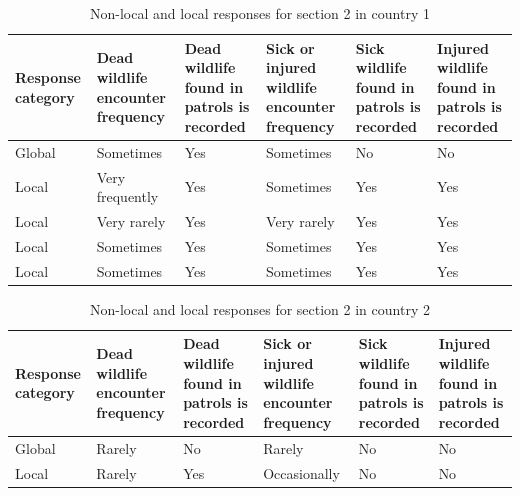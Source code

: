 \documentclass[
  letterpaper,
  DIV=11,
  numbers=noendperiod]{scrartcl}
\begin{document}
\begin{table}[H]

\caption{Non-local and local responses for section 2 in country 1}
\centering
\begin{tabular}[t]{>{\raggedright\arraybackslash}p{2cm}|>{\raggedright\arraybackslash}p{3cm}|>{\raggedright\arraybackslash}p{2cm}|>{\raggedright\arraybackslash}p{3cm}|>{\raggedright\arraybackslash}p{2cm}|>{\raggedright\arraybackslash}p{2cm}}
\hline
Response
category & Dead wildlife
encounter frequency & Dead wildlife
found in patrols
is recorded & Sick or injured wildlife
encounter frequency & Sick wildlife
found in patrols
is recorded & Injured wildlife
found in patrols
is recorded\\
\hline
Global & Sometimes & Yes & Sometimes & No & No\\
\hline
Local & Very frequently & Yes & Sometimes & Yes & Yes\\
\hline
Local & Very rarely & Yes & Very rarely & Yes & Yes\\
\hline
Local & Sometimes & Yes & Sometimes & Yes & \vphantom{1} Yes\\
\hline
Local & Sometimes & Yes & Sometimes & Yes & Yes\\
\hline
\end{tabular}
\end{table}

\begin{table}[H]

\caption{Non-local and local responses for section 2 in country 2}
\centering
\begin{tabular}[t]{>{\raggedright\arraybackslash}p{2cm}|>{\raggedright\arraybackslash}p{3cm}|>{\raggedright\arraybackslash}p{2cm}|>{\raggedright\arraybackslash}p{3cm}|>{\raggedright\arraybackslash}p{2cm}|>{\raggedright\arraybackslash}p{2cm}}
\hline
Response
category & Dead wildlife
encounter frequency & Dead wildlife
found in patrols
is recorded & Sick or injured wildlife
encounter frequency & Sick wildlife
found in patrols
is recorded & Injured wildlife
found in patrols
is recorded\\
\hline
Global & Rarely & No & Rarely & No & No\\
\hline
Local & Rarely & Yes & Occasionally & No & No\\
\hline
\end{tabular}
\end{table}
\end{document}
